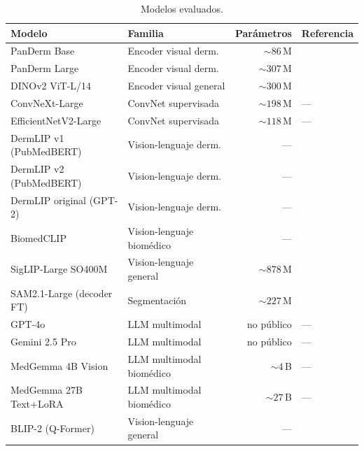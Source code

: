 \begin{table}[htbp]
\centering
\footnotesize
\setlength{\tabcolsep}{4pt}
\renewcommand{\arraystretch}{0.95}
\caption{Modelos evaluados.}
\label{tab:modelos}
\begin{tabular}{llrl}
\hline
Modelo & Familia & Parámetros & Referencia \\
\hline
PanDerm Base                & Encoder visual derm.       & $\sim 86$\,M & \cite{panderm2025} \\
PanDerm Large               & Encoder visual derm.       & $\sim 307$\,M & \cite{panderm2025} \\
DINOv2 ViT-L/14             & Encoder visual general     & $\sim 300$\,M & \cite{dinov2} \\
ConvNeXt-Large              & ConvNet supervisada        & $\sim 198$\,M & --- \\
EfficientNetV2-Large        & ConvNet supervisada        & $\sim 118$\,M & --- \\
DermLIP v1 (PubMedBERT)     & Vision-lenguaje derm.      & --- & \cite{derm1m} \\
DermLIP v2 (PubMedBERT)     & Vision-lenguaje derm.      & --- & \cite{derm1m} \\
DermLIP original (GPT-2)    & Vision-lenguaje derm.      & --- & \cite{derm1m} \\
BiomedCLIP                  & Vision-lenguaje biomédico  & --- & \cite{biomedclip} \\
SigLIP-Large SO400M         & Vision-lenguaje general    & $\sim 878$\,M & \cite{siglip2023} \\
SAM2.1-Large (decoder FT)   & Segmentación               & $\sim 227$\,M & \cite{sam2} \\
GPT-4o                      & LLM multimodal             & no público & --- \\
Gemini 2.5 Pro              & LLM multimodal             & no público & --- \\
MedGemma 4B Vision          & LLM multimodal biomédico   & $\sim 4$\,B & --- \\
MedGemma 27B Text+LoRA      & LLM multimodal biomédico   & $\sim 27$\,B & --- \\
BLIP-2 (Q-Former)           & Vision-lenguaje general    & --- & \cite{blip2_2023} \\
\hline
\end{tabular}
\end{table}

